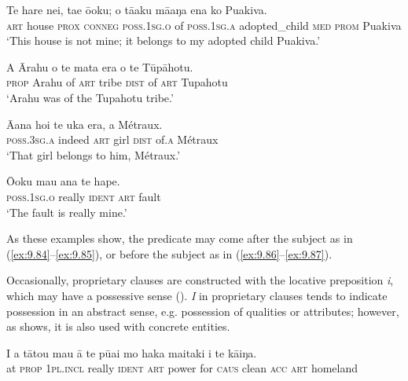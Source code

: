 \ea\label{ex:9.84}
\gll Te hare nei, ta{\ꞌ}e ō{\ꞌ}oku; o tā{\ꞌ}aku mā{\ꞌ}aŋa ena ko Puakiva. \\
\textsc{art} house \textsc{prox} \textsc{conneg} \textsc{poss.1sg.o} of \textsc{poss.1sg.a} adopted\_child \textsc{med} \textsc{prom} Puakiva \\

\glt 
‘This house is not mine; it belongs to my adopted child Puakiva.’ \textstyleExampleref{[R229.268]} 
\z

\ea\label{ex:9.85}
\gll A {\ꞌ}Ārahu o te mata era o te Tūpāhotu. \\
\textsc{prop} Arahu of \textsc{art} tribe \textsc{dist} of \textsc{art} Tupahotu \\

\glt 
‘Arahu was of the Tupahotu tribe.’ \textstyleExampleref{[R432.002]} 
\z

\ea\label{ex:9.86}
\gll {\ꞌ}Ā{\ꞌ}ana ho{\ꞌ}i te uka era, {\ꞌ}a Métraux. \\
\textsc{poss.3sg.a} indeed \textsc{art} girl \textsc{dist} of\textsc{.a} Métraux \\

\glt 
‘That girl belongs to him, Métraux.’ \textstyleExampleref{[R416.813]} 
\z

\ea\label{ex:9.87}
\gll Ō{\ꞌ}oku mau {\ꞌ}ana te hape. \\
\textsc{poss.1sg.o} really \textsc{ident} \textsc{art} fault \\

\glt
‘The fault is really mine.’ \textstyleExampleref{[R236.095]} 
\z

As these examples show, the predicate may come after the subject as in (\ref{ex:9.84}–\ref{ex:9.85}), or before the subject as in (\ref{ex:9.86}–\ref{ex:9.87}).

Occasionally, proprietary clauses are constructed with the locative preposition \textit{i}, which may have a possessive sense (). \textit{I} in proprietary clauses tends to indicate possession in an abstract sense, e.g. possession of qualities or attributes; however, as  shows, it is also used with concrete entities.

\ea\label{ex:9.88}
\gll I a tātou mau {\ꞌ}ā te pūai mo haka ma{\ꞌ}itaki i te kāiŋa. \\
at \textsc{prop} \textsc{1pl.incl} really \textsc{ident} \textsc{art} power for \textsc{caus} clean \textsc{acc} \textsc{art} homeland \\

